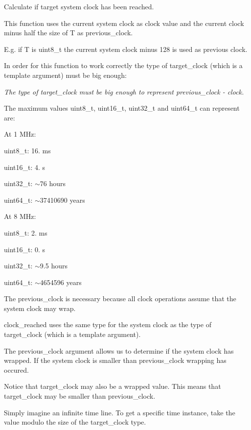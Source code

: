 Calculate if target system clock has been reached. 

This function uses the current system clock as clock value and the current clock minus half the size of T as previous\+\_\+clock.

E.\+g. if T is uint8\+\_\+t the current system clock minus 128 is used as previous clock.

In order for this function to work correctly the type of target\+\_\+clock (which is a template argument) must be big enough\+:

{\itshape The type of target\+\_\+clock must be big enough to represent {\ttfamily previous\+\_\+clock -\/ clock}.}

The maximum values uint8\+\_\+t, uint16\+\_\+t, uint32\+\_\+t and uint64\+\_\+t can represent are\+:

At 1 M\+Hz\+:
\begin{DoxyItemize}
\item uint8\+\_\+t\+: 16. ms
\item uint16\+\_\+t\+: 4. s
\item uint32\+\_\+t\+: $\sim$76 hours
\item uint64\+\_\+t\+: $\sim$37\textquotesingle{}410\textquotesingle{}690 years
\end{DoxyItemize}

At 8 M\+Hz\+:
\begin{DoxyItemize}
\item uint8\+\_\+t\+: 2. ms
\item uint16\+\_\+t\+: 0. s
\item uint32\+\_\+t\+: $\sim$9.5 hours
\item uint64\+\_\+t\+: $\sim$4\textquotesingle{}654\textquotesingle{}596 years
\end{DoxyItemize}

The previous\+\_\+clock is necessary because all clock operations assume that the system clock may wrap.

clock\+\_\+reached uses the same type for the system clock as the type of target\+\_\+clock (which is a template argument).

The previous\+\_\+clock argument allows us to determine if the system clock has wrapped. If the system clock is smaller than previous\+\_\+clock wrapping has occured.

Notice that target\+\_\+clock may also be a wrapped value. This means that target\+\_\+clock may be smaller than previous\+\_\+clock.

Simply imagine an infinite time line. To get a specific time instance, take the value modulo the size of the target\+\_\+clock type.

